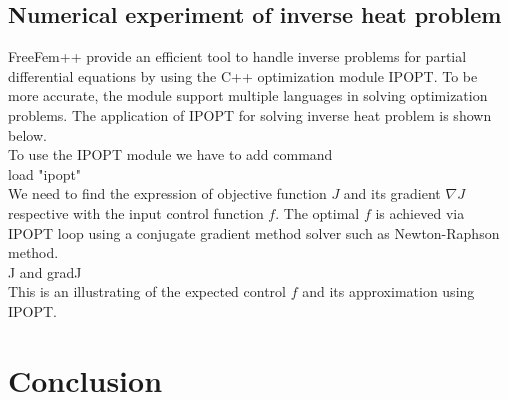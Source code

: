 \documentclass[notitlepage,a4paper,fleqn,9pt]{icmfarticle}
\begin{document}
\begin{multicols}{2}
\subsection{Numerical experiment of inverse heat problem}
FreeFem++ provide an efficient tool to handle inverse problems for partial differential equations by using the C++ optimization module IPOPT. To be more accurate, the module support multiple languages in solving optimization problems. The application of IPOPT for solving inverse heat problem is shown below.\\
To use the IPOPT module we have to add command\\
load "ipopt"\\
We need to find the expression of objective function $J$ and its gradient $\nabla J$ respective with the input control function $f$. The optimal $f$ is achieved via IPOPT loop using a conjugate gradient method solver such as Newton-Raphson method.\\
J and gradJ\\
This is an illustrating of the expected control $f$ and its approximation using IPOPT. 



\section{Conclusion}



{}
\vfill
\end{multicols}
\end{document}
